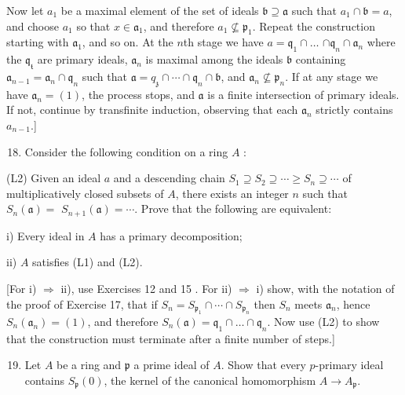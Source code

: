 \documentclass{standalone}
\theoremstyle{definition}
\theoremstyle{remark}
\begin{document}
Now let $a_{1}$ be a maximal element of the set of ideals $\mathfrak{b}
\supseteq \mathfrak{a}$ such that $a_{1} \cap \mathfrak{b}=a$, and choose
$a_{1}$ so that $x \in \mathfrak{a}_{1}$, and therefore $a_{1} \nsubseteq
\mathfrak{p}_{1}$. Repeat the construction starting with $\mathfrak{a}_{1}$, and
so on. At the $n$th stage we have $a=\mathfrak{q}_{1} \cap \ldots$ $\cap
\mathfrak{q}_{n} \cap \mathfrak{a}_{n}$ where the $\mathfrak{q}_{\mathfrak{t}}$
are primary ideals, $\mathfrak{a}_{n}$ is maximal among the ideals
$\mathfrak{b}$ containing $\mathfrak{a}_{n-1}=\mathfrak{a}_{n} \cap
\mathfrak{q}_{n}$ such that $\mathfrak{a}=q_{\mathfrak{z}} \cap \cdots \cap
\mathfrak{q}_{n} \cap \mathfrak{b}$, and $\mathfrak{a}_{n} \nsubseteq
\mathfrak{p}_{n}$. If at any stage we have $\mathfrak{a}_{n}=(1)$, the process
stops, and $\mathfrak{a}$ is a finite intersection of primary ideals. If not,
continue by transfinite induction, observing that each $\mathfrak{a}_{n}$
strictly contains $a_{n-1}$.]

\begin{enumerate}
  \setcounter{enumi}{17}
  \item Consider the following condition on a ring $A$ :
\end{enumerate}

(L2) Given an ideal $a$ and a descending chain $S_{1} \supseteq S_{2} \supseteq
\cdots \geq S_{n} \supseteq \cdots$ of multiplicatively closed subsets of $A$,
there exists an integer $n$ such that $S_{n}(\mathfrak{a})=$
$S_{n+1}(\mathfrak{a})=\cdots$. Prove that the following are equivalent:

i) Every ideal in $A$ has a primary decomposition;

ii) $A$ satisfies (L1) and (L2).

[For i) $\Rightarrow$ ii), use Exercises 12 and 15 . For ii) $\Rightarrow$ i)
show, with the notation of the proof of Exercise 17, that if
$S_{n}=S_{\mathfrak{p}_{1}} \cap \cdots \cap S_{\mathfrak{p}_{n}}$ then $S_{n}$
meets $\mathfrak{a}_{n}$, hence $S_{n}\left(\mathfrak{a}_{n}\right)=(1)$, and
therefore $S_{n}(\mathfrak{a})=\mathfrak{q}_{1} \cap \ldots \cap
\mathfrak{q}_{n}$. Now use (L2) to show that the construction must terminate
after a finite number of steps.]

\begin{enumerate}
  \setcounter{enumi}{18}
  \item Let $A$ be a ring and $\mathfrak{p}$ a prime ideal of $A$. Show that
  every $p$-primary ideal contains $S_{\mathfrak{p}}(0)$, the kernel of the
  canonical homomorphism $A \rightarrow A_{\mathfrak{p}}$.
\end{enumerate}
\end{document}
